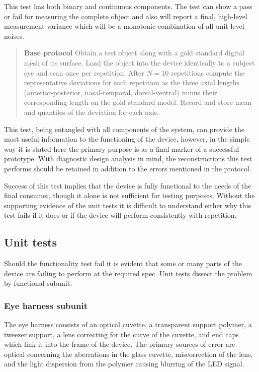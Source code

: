 \documentclass{article}
\begin{document}
This test has both binary and continuous components. The test can show a pass or fail for measuring the complete object and also will report a final, high-level measurement variance which will be a monotonic combination of all unit-level noises.

\begin{quotation}
\noindent\textbf{Base protocol} Obtain a test object along with a gold standard digital mesh of its surface. Load the object into the device identically to a subject eye and scan once per repetition. After $N = 10$ repetitions compute the representative deviations for each repetition as the three axial lengths (anterior-posterior, nasal-temporal, dorsal-ventral) minus their corresponding length on the gold standard model. Record and store mean and quantiles of the deviation for each axis.
\end{quotation}

This test, being entangled with all components of the system, can provide the most useful information to the functioning of the device, however, in the simple way it is stated here the primary purpose is as a final marker of a successful prototype. With diagnostic design analysis in mind, the reconstructions this test performs should be retained in addition to the errors mentioned in the protocol.

Success of this test implies that the device is fully functional to the needs of the final consumer, though it alone is not sufficient for testing purposes. Without the supporting evidence of the unit tests it is difficult to understand either why this test fails if it does or if the device will perform consistently with repetition.

\subsection{Unit tests}
\label{sec:unit-tests}

Should the functionality test fail it is evident that some or many parts of the device are failing to perform at the required spec. Unit tests dissect the problem by functional subunit.

\subsubsection{Eye harness subunit}
The eye harness consists of an optical cuvette, a transparent support polymer, a tweezer support, a lens correcting for the curve of the cuvette, and end caps which link it into the frame of the device. The primary sources of error are optical concerning the aberrations in the glass cuvette, miscorrection of the lens, and the light dispersion from the polymer causing blurring of the LED signal.
\end{document}
